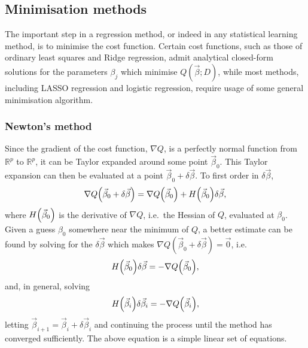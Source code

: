 \documentclass[11pt,british,a4paper]{article}
\numberwithin{equation}{section}
\begin{document}
\subsection{Minimisation methods}
The important step in a regression method, or indeed in any statistical learning method, is to minimise the cost function.
Certain cost functions, such as those of ordinary least squares and Ridge regression, admit analytical closed-form solutions for the parameters \(\beta_j\) which minimise \(Q(\vec{\beta};D)\), while most methods, including LASSO regression and logistic regression, require usage of some general minimisation algorithm.

\subsubsection{Newton's method}\label{subsubsec:newton}
Since the gradient of the cost function, \(\nabla Q\), is a perfectly normal function from \(\mathbb{R}^p\) to \(\mathbb{R}^p\), it can be Taylor expanded around some point \(\vec{\beta}_0\).
This Taylor expansion can then be evaluated at a point \(\vec{\beta}_0 + \delta\vec{\beta}\). To first order in \(\delta\vec{\beta}\),
\begin{equation}
    \nabla Q\qty(\vec{\beta}_0 + \delta\vec{\beta}) = \nabla Q\qty(\vec{\beta}_0) + H\qty(\vec{\beta}_0)\delta\vec{\beta},
\end{equation}
where \(H\qty(\vec{\beta}_0)\) is the derivative of \(\nabla Q\), i.e.\ the Hessian of \(Q\), evaluated at \(\beta_0\).
Given a guess \(\beta_0\) somewhere near the minimum of \(Q\), a better estimate can be found by solving for the \(\delta\vec{\beta}\) which makes \(\nabla Q(\vec{\beta}_0 + \delta\vec{\beta}) = \vec{0}\), i.e.
\begin{equation}
    H\qty(\vec{\beta}_0)\delta\vec{\beta} = -\nabla Q\qty(\vec{\beta}_0),
\end{equation}
and, in general, solving
\begin{equation}
    H\qty(\vec{\beta}_i)\delta\vec{\beta}_i = -\nabla Q\qty(\vec{\beta}_i),\label{eq:newtonstep}
\end{equation}
letting \(\vec{\beta}_{i+1} = \vec{\beta}_i + \delta\vec{\beta}_i\) and continuing the process until the method has converged sufficiently.
The above equation is a simple linear set of equations.
\end{document}
